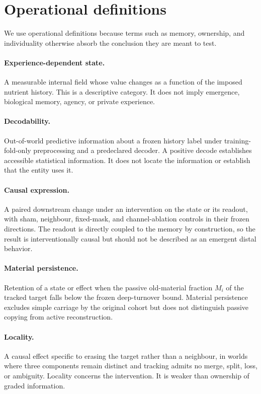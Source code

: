 \documentclass[11pt]{article}
\begin{document}
\section{Operational definitions}

We use operational definitions because terms such as memory, ownership, and individuality otherwise absorb the conclusion they are meant to test.

\paragraph{Experience-dependent state.}
A measurable internal field whose value changes as a function of the imposed nutrient history. This is a descriptive category. It does not imply emergence, biological memory, agency, or private experience.

\paragraph{Decodability.}
Out-of-world predictive information about a frozen history label under training-fold-only preprocessing and a predeclared decoder. A positive decode establishes accessible statistical information. It does not locate the information or establish that the entity uses it.

\paragraph{Causal expression.}
A paired downstream change under an intervention on the state or its readout, with sham, neighbour, fixed-mask, and channel-ablation controls in their frozen directions. The readout is directly coupled to the memory by construction, so the result is interventionally causal but should not be described as an emergent distal behavior.

\paragraph{Material persistence.}
Retention of a state or effect when the passive old-material fraction $M_i$ of the tracked target falls below the frozen deep-turnover bound. Material persistence excludes simple carriage by the original cohort but does not distinguish passive copying from active reconstruction.

\paragraph{Locality.}
A causal effect specific to erasing the target rather than a neighbour, in worlds where three components remain distinct and tracking admits no merge, split, loss, or ambiguity. Locality concerns the intervention. It is weaker than ownership of graded information.
\end{document}
